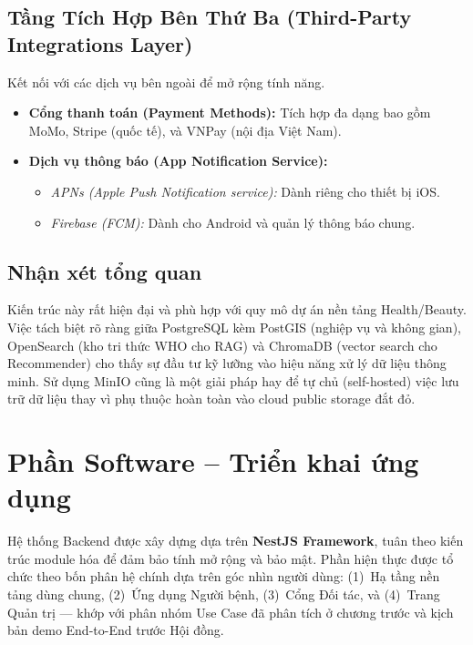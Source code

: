 \subsection*{Tầng Tích Hợp Bên Thứ Ba (Third-Party Integrations Layer)}
Kết nối với các dịch vụ bên ngoài để mở rộng tính năng.

\begin{itemize}
    \item \textbf{Cổng thanh toán (Payment Methods):} Tích hợp đa dạng bao gồm MoMo, Stripe (quốc tế), và VNPay (nội địa Việt Nam).
    \item \textbf{Dịch vụ thông báo (App Notification Service):}
    \begin{itemize}
        \item \textit{APNs (Apple Push Notification service):} Dành riêng cho thiết bị iOS.
        \item \textit{Firebase (FCM):} Dành cho Android và quản lý thông báo chung.
    \end{itemize}
\end{itemize}

\subsection*{Nhận xét tổng quan}
Kiến trúc này rất hiện đại và phù hợp với quy mô dự án nền tảng Health/Beauty. Việc tách biệt rõ ràng giữa PostgreSQL kèm PostGIS (nghiệp vụ và không gian), OpenSearch (kho tri thức WHO cho RAG) và ChromaDB (vector search cho Recommender) cho thấy sự đầu tư kỹ lưỡng vào hiệu năng xử lý dữ liệu thông minh. Sử dụng MinIO cũng là một giải pháp hay để tự chủ (self-hosted) việc lưu trữ dữ liệu thay vì phụ thuộc hoàn toàn vào cloud public storage đắt đỏ.
\section{Phần Software – Triển khai ứng dụng}

Hệ thống Backend được xây dựng dựa trên \textbf{NestJS Framework}, tuân theo kiến trúc module hóa để đảm bảo tính mở rộng và bảo mật. Phần hiện thực được tổ chức theo bốn phân hệ chính dựa trên góc nhìn người dùng: (1)~Hạ tầng nền tảng dùng chung, (2)~Ứng dụng Người bệnh, (3)~Cổng Đối tác, và (4)~Trang Quản trị --- khớp với phân nhóm Use Case đã phân tích ở chương trước và kịch bản demo End-to-End trước Hội đồng.



